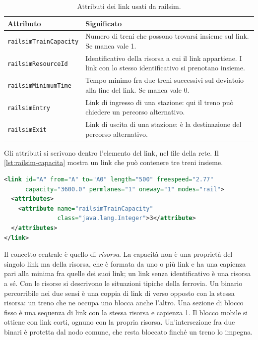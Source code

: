 \begin{table}[H]
	\centering
	\caption{Attributi dei link usati da railsim.}
	\label{tab:railsim-link}
	\begin{tabularx}{\textwidth}{lX}
		\toprule
		Attributo & Significato \\
		\midrule
		\texttt{railsimTrainCapacity} & Numero di treni che possono trovarsi insieme sul link. Se manca vale 1. \\
		\texttt{railsimResourceId} & Identificativo della risorsa a cui il link appartiene. I link con lo stesso identificativo si prenotano insieme. \\
		\texttt{railsimMinimumTime} & Tempo minimo fra due treni successivi sul deviatoio alla fine del link. Se manca vale 0. \\
		\texttt{railsimEntry} & Link di ingresso di una stazione: qui il treno può chiedere un percorso alternativo. \\
		\texttt{railsimExit} & Link di uscita di una stazione: è la destinazione del percorso alternativo. \\
		\bottomrule
	\end{tabularx}
\end{table}

Gli attributi si scrivono dentro l'elemento del link, nel file della rete. Il \cref{lst:railsim-capacita} mostra un link che può contenere tre treni insieme.

\begin{lstlisting}[language=XML,caption={Link con capienza di tre treni.},label={lst:railsim-capacita}]
<link id="A" from="A" to="A0" length="500" freespeed="2.77"
      capacity="3600.0" permlanes="1" oneway="1" modes="rail">
  <attributes>
    <attribute name="railsimTrainCapacity"
               class="java.lang.Integer">3</attribute>
  </attributes>
</link>
\end{lstlisting}

Il concetto centrale è quello di \textit{risorsa}. La capacità non è una proprietà del singolo link ma della risorsa, che è formata da uno o più link e ha una capienza pari alla minima fra quelle dei suoi link; un link senza identificativo è una risorsa a sé. Con le risorse si descrivono le situazioni tipiche della ferrovia. Un binario percorribile nei due sensi è una coppia di link di verso opposto con la stessa risorsa: un treno che ne occupa uno blocca anche l'altro. Una sezione di blocco fisso è una sequenza di link con la stessa risorsa e capienza 1. Il blocco mobile si ottiene con link corti, ognuno con la propria risorsa. Un'intersezione fra due binari è protetta dal nodo comune, che resta bloccato finché un treno lo impegna.


